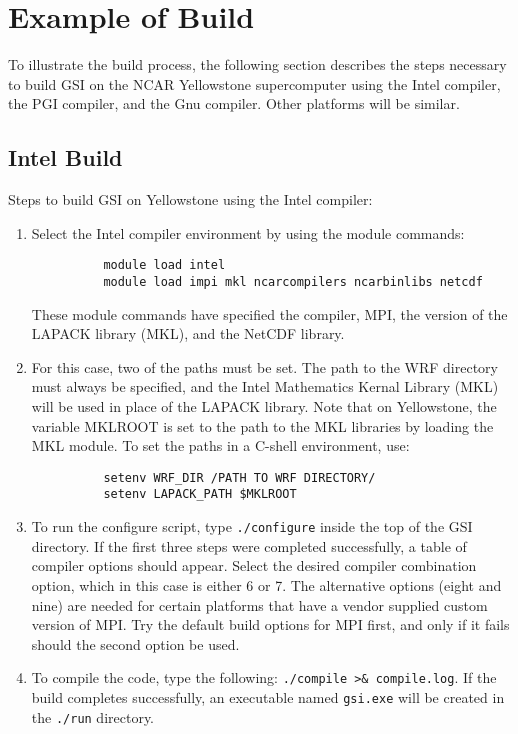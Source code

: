 \section{Example of Build} \label{ch2_buildexample}

To illustrate the build process, the following section describes the steps necessary to build GSI on the NCAR Yellowstone supercomputer using the Intel compiler, the PGI compiler, and the Gnu compiler. Other platforms will be similar.

\subsection{Intel Build}

Steps to build GSI on Yellowstone using the Intel compiler:
\begin{enumerate}
\item Select the Intel compiler environment by using the module commands:
\begin{verbatim}
          module load intel
          module load impi mkl ncarcompilers ncarbinlibs netcdf
\end{verbatim}
These module commands have specified the compiler, MPI, the version of the LAPACK library (MKL), and the NetCDF library.
\item For this case, two of the paths must be set. The path to the WRF directory must always be specified, and the Intel Mathematics Kernal Library (MKL) will be used in place of the LAPACK library. Note that on Yellowstone, the variable MKLROOT is set to the path to the MKL libraries by loading the MKL module. To set the paths in a C-shell environment, use:
\begin{verbatim}
          setenv WRF_DIR /PATH TO WRF DIRECTORY/
          setenv LAPACK_PATH $MKLROOT
\end{verbatim}
\item To run the configure script, type \verb|./configure| inside the top of the GSI directory. If the first three steps were completed successfully, a table of compiler options should appear. Select the desired compiler combination option, which in this case is either 6 or 7. The alternative options (eight and nine) are needed for certain platforms that have a vendor supplied custom version of MPI. Try the default build options for MPI first, and only if it fails should the second option be used.
\item To compile the code, type the following: \verb|./compile >& compile.log|. If the build completes successfully, an executable named \verb|gsi.exe| will be created in the \verb|./run| directory.
\end{enumerate}

